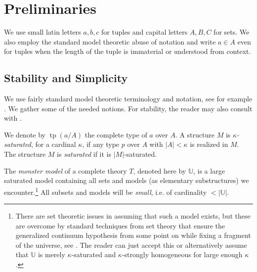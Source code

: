 \documentclass[a4paper]{amsart}
\theoremstyle{plain}
\theoremstyle{definition}
\theoremstyle{remark}
\numberwithin{equation}{section}
\DeclareMathOperator{\tp}{tp}
\begin{document}






%

\section{Preliminaries}\label{sec:Preliminaries}

We use small latin letters $a,b,c$ for tuples and capital letters $A,B,C$ for sets. We also employ the standard model theoretic abuse of notation and write $a\in A$ even for tuples when the length of the tuple is immaterial or understood from context.

\subsection{Stability and Simplicity}
We use fairly standard model theoretic terminology and notation, see for example \cite{TZ}. We gather some of the needed notions. For stability, the reader may also consult with \cite{classification}.

We denote by $\tp(a/A)$ the complete type of $a$ over $A$. 
A structure $M$ is \emph{$\kappa$-saturated}, for a cardinal $\kappa$, if any type $p$ over $A$ with $|A|< \kappa$ is realized in $M$. The structure $M$ is \emph{saturated} if it is $|M|$-saturated.

The \emph{monster model} of a complete theory $T$, denoted here by $\mathbb{U}$, is a large saturated model containing all sets and models (as elementary substructures) we  encounter.\footnote{There are set theoretic issues in assuming that such a model exists, but these are overcome by standard techniques from set theory that ensure the generalized continuum hypothesis from some point on while fixing a fragment of the universe, see \cite{HaKa}. The reader can just accept this or alternatively assume that $\mathbb{U}$ is merely $\kappa$-saturated and $\kappa$-strongly homogeneous for large enough $\kappa$.}  All subsets and models will be \emph{small}, i.e. of cardinality $<|\mathbb{U}|$.
\end{document}
